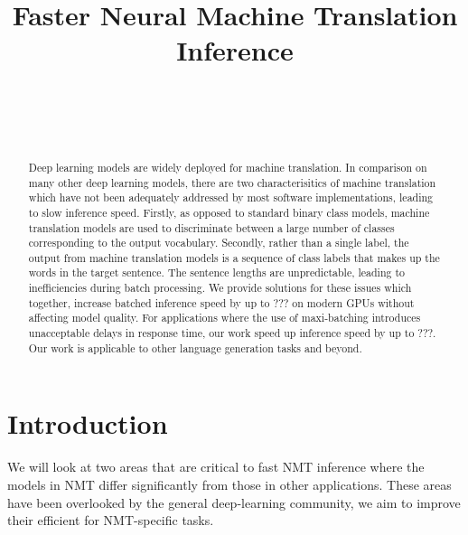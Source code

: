 \documentclass[11pt,a4paper]{article}
\begin{document}
\title{\bf Faster Neural Machine Translation Inference}  

\author{ \hfill  {}\\ 
        \addr{}
\AND
        \hfill {}\\
\AND
        \hfill {}\\
}

\maketitle
\pagestyle{empty}

\begin{abstract}

Deep learning models are widely deployed for machine translation. In comparison on many other deep learning models, there are two characterisitics of machine translation which have not been adequately addressed by most software implementations, leading to slow inference speed. Firstly, as opposed to standard binary class models, machine translation models are used to discriminate between a large number of classes corresponding to the output vocabulary. Secondly, rather than a single label, the output from machine translation models is a sequence of class labels that makes up the words in the target sentence. The sentence lengths are unpredictable, leading to inefficiencies during batch processing. We provide solutions for these issues which together, increase batched inference speed by up to ??? on modern GPUs without affecting model quality. For applications where the use of maxi-batching introduces unacceptable delays in response time, our work speed up inference speed by up to ???. Our work is applicable to other language generation tasks and beyond.

\end{abstract}

\section{Introduction}

We will look at two areas that are critical to fast NMT inference where the models in NMT differ significantly from those in other applications. These areas have been overlooked by the general deep-learning community, we aim to improve their efficient for NMT-specific tasks.
\end{document}
